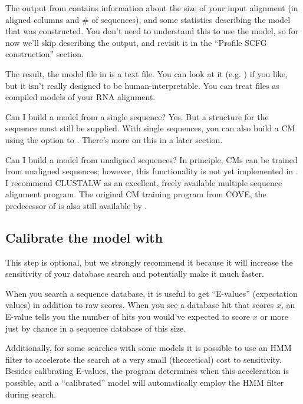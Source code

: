 The output from  contains information about the size of your
input alignment (in aligned columns and \# of sequences), and some statistics
describing the model that was constructed. You don't need to understand this to
use the model, so for now we'll skip describing the output, and
revisit it in the ``Profile SCFG construction'' section.

The result, the model file in  is a text file. You can
look at it (e.g. ) if you like, but it isn't really
designed to be human-interpretable. You can treat  files as
compiled models of your RNA alignment.

\begin{srefaq}{Can I build a model from a single sequence?}
Yes. But a structure for the sequence must still be supplied.
With single sequences, you can also build a  \cite{KleinEddy03} CM 
using the  option to . There's more on
this in a later section.
\end{srefaq}

\begin{srefaq}{Can I build a model from unaligned sequences?}
In principle, CMs can be trained from unaligned sequences;
however, this functionality is not yet implemented in .  I
recommend CLUSTALW as an excellent, freely available multiple sequence
alignment program. The original  CM training
program from COVE, the predecessor of  is also
still available by
.
\end{srefaq}

\subsection{Calibrate the model with }

This step is optional, but we strongly recommend it because it will
increase the sensitivity of your database search and potentially make
it much faster.

When you search a sequence database, it is useful to get ``E-values''
(expectation values) in addition to raw scores. When you see a
database hit that scores $x$, an E-value tells you the number of hits
you would've expected to score $x$ or more just by chance in a
sequence database of this size. 

Additionally, for some searches with some models it is possible to use
an HMM filter to accelerate the search at a very small (theoretical)
cost to sensitivity. Besides calibrating E-values, the
 program determines when this acceleration is
possible, and a ``calibrated'' model will automatically employ the HMM
filter during search.

